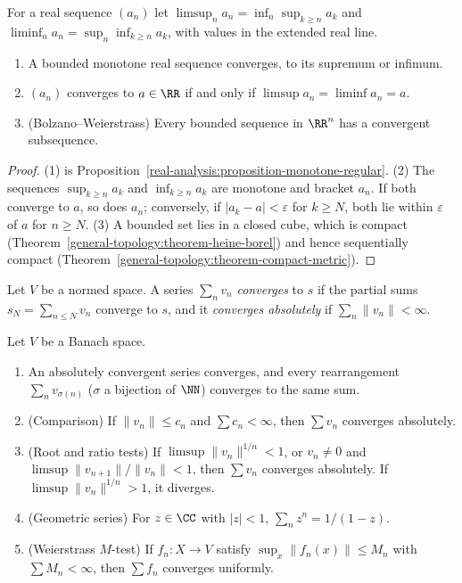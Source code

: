 \begin{definition}\label{real-analysis:definition-limsup}
For a real sequence $(a_n)$ let $\limsup_n a_n = \inf_n\sup_{k \geq n}a_k$ and $\liminf_n a_n = \sup_n\inf_{k \geq n}a_k$, with values in the extended real line.
\end{definition}

\begin{proposition}\label{real-analysis:proposition-monotone}
\begin{enumerate}
\item A bounded monotone real sequence converges, to its supremum or infimum.
\item $(a_n)$ converges to $a \in \RR$ if and only if $\limsup a_n = \liminf a_n = a$.
\item (Bolzano--Weierstrass) Every bounded sequence in $\RR^n$ has a convergent subsequence.
\end{enumerate}
\end{proposition}

\begin{proof}
(1) is Proposition~\ref{real-analysis:proposition-monotone-regular}. (2) The sequences $\sup_{k \geq n}a_k$ and $\inf_{k \geq n}a_k$ are monotone and bracket $a_n$. If both converge to $a$, so does
$a_n$; conversely, if $|a_k - a| < \varepsilon$ for $k \geq N$, both lie within $\varepsilon$ of $a$ for $n \geq N$. (3) A bounded set lies in a closed cube, which is compact
(Theorem~\ref{general-topology:theorem-heine-borel}) and hence sequentially compact (Theorem~\ref{general-topology:theorem-compact-metric}).
\end{proof}

\begin{definition}\label{real-analysis:definition-series}
Let $V$ be a normed space. A series $\sum_n v_n$ \emph{converges} to $s$ if the partial sums $s_N = \sum_{n \leq N}v_n$ converge to $s$, and it \emph{converges absolutely}
if $\sum_n\|v_n\| < \infty$.
\end{definition}

\begin{proposition}\label{real-analysis:proposition-series}
Let $V$ be a Banach space.
\begin{enumerate}
\item An absolutely convergent series converges, and every rearrangement $\sum_n v_{\sigma(n)}$ ($\sigma$ a bijection of $\NN$) converges to the same sum.
\item (Comparison) If $\|v_n\| \leq c_n$ and $\sum c_n < \infty$, then $\sum v_n$ converges absolutely.
\item (Root and ratio tests) If $\limsup\|v_n\|^{1/n} < 1$, or $v_n \neq 0$ and $\limsup\|v_{n+1}\|/\|v_n\| < 1$, then $\sum v_n$ converges absolutely. If $\limsup\|v_n\|^{1/n} > 1$, it
diverges.
\item (Geometric series) For $z \in \CC$ with $|z| < 1$, $\sum_n z^n = 1/(1 - z)$.
\item (Weierstrass $M$-test) If $f_n \colon X \to V$ satisfy $\sup_x\|f_n(x)\| \leq M_n$ with $\sum M_n < \infty$, then $\sum f_n$ converges uniformly.
\end{enumerate}
\end{proposition}


